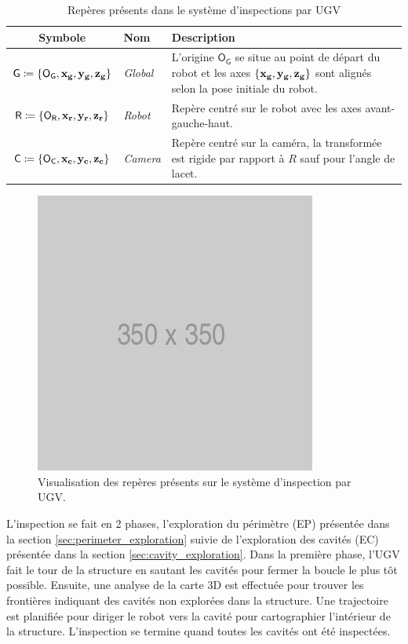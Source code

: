 \begin{table}[htp]
  \centering
  \setlength{\tabcolsep}{12pt}
  \begin{tabular}[htp]{|c|l|p{9cm}|}
    \hline
    Symbole & Nom                   & Description\\\hline
    $\mathsf{G} \coloneqq \{\mathsf{O_G}, \mathbf{x_g}, \mathbf{y_g}, \mathbf{z_g} \} $     &  \textit{Global}      & L'origine $\mathsf{O_G}$ se situe au point de départ du robot et les axes $\{\mathbf{x_g}, \mathbf{y_g}, \mathbf{z_g} \}$ sont alignés selon la pose initiale du robot.\\\hline
    $\mathsf{R} \coloneqq \{\mathsf{O_R}, \mathbf{x_r}, \mathbf{y_r}, \mathbf{z_r} \} $     &  \textit{Robot}       & Repère centré sur le robot avec les axes avant-gauche-haut.\\\hline
    $\mathsf{C} \coloneqq \{\mathsf{O_C}, \mathbf{x_c}, \mathbf{y_c}, \mathbf{z_c} \}$     &  \textit{Camera}      & Repère centré sur la caméra, la transformée est rigide par rapport à $R$ sauf pour l'angle de lacet. \\\hline
  \end{tabular}
  \setlength{\tabcolsep}{6pt}
  \caption{Repères présents dans le système d'inspections par UGV}
  \label{table:ugv_frames}
\end{table}

\begin{figure}[htp]
  \centering
  \includegraphics[width=0.3\linewidth]{images/placeholder.png}
  \caption{Visualisation des repères présents sur le système d'inspection par UGV.}
  \label{fig:ugv_frames}
\end{figure}

L'inspection se fait en 2 phases, l'exploration du périmètre (EP) présentée dans la section \ref{sec:perimeter_exploration} suivie de l'exploration des cavités (EC) présentée dans la section \ref{sec:cavity_exploration}. Dans la première phase, l'UGV fait le tour de la structure en sautant les cavités pour fermer la boucle le plus tôt possible. Ensuite, une analyse de la carte 3D est effectuée pour trouver les frontières indiquant des cavités non explorées dans la structure. Une trajectoire est planifiée pour diriger le robot vers la cavité pour cartographier l'intérieur de la structure. L'inspection se termine quand toutes les cavités ont été inspectées.

